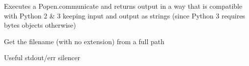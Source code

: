 \documentclass[letterpaper,10pt,english]{sphinxmanual}
\begin{document}

\begin{fulllineitems}
\label{doctree/soprano.utils:soprano.utils.safe_communicate}
Executes a Popen.communicate and returns output in a way that is
compatible with Python 2 \& 3 keeping input and output as strings (since
Python 3 requires bytes objects otherwise)

\end{fulllineitems}


\begin{fulllineitems}
\label{doctree/soprano.utils:soprano.utils.seedname}
Get the filename (with no extension) from a full path

\end{fulllineitems}


\begin{fulllineitems}
\label{doctree/soprano.utils:soprano.utils.silence_stdio}
Useful stdout/err silencer

\end{fulllineitems}

\end{document}
